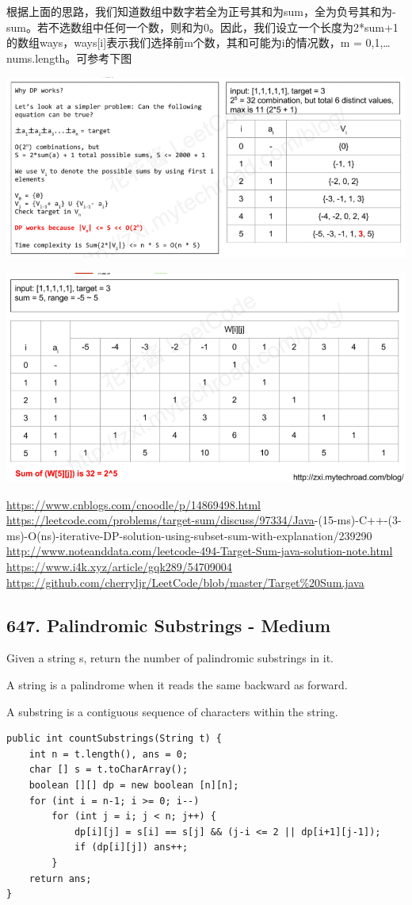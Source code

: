 \documentclass[9pt, b5paaper]{book}
\begin{document}
\begin{enumerate}
根据上面的思路，我们知道数组中数字若全为正号其和为sum，全为负号其和为-sum。若不选数组中任何一个数，则和为0。因此，我们设立一个长度为2*sum+1的数组ways，ways[i]表示我们选择前m个数，其和可能为i的情况数，m = 0,1,\ldots{}nums.length。可参考下图

\includegraphics[width=.9\linewidth]{./pic/targetSum.png}

\includegraphics[width=.9\linewidth]{./pic/targetSum2.png}

\url{https://www.cnblogs.com/cnoodle/p/14869498.html}
\url{https://leetcode.com/problems/target-sum/discuss/97334/Java}-(15-ms)-C++-(3-ms)-O(ns)-iterative-DP-solution-using-subset-sum-with-explanation/239290
\url{http://www.noteanddata.com/leetcode-494-Target-Sum-java-solution-note.html}
\url{https://www.i4k.xyz/article/gqk289/54709004}
\url{https://github.com/cherryljr/LeetCode/blob/master/Target\%20Sum.java}
\end{enumerate}

\subsection{647. Palindromic Substrings - Medium}
\label{sec-1-1-7}
Given a string s, return the number of palindromic substrings in it.

A string is a palindrome when it reads the same backward as forward.

A substring is a contiguous sequence of characters within the string.
\begin{verbatim}
public int countSubstrings(String t) {
    int n = t.length(), ans = 0;
    char [] s = t.toCharArray();
    boolean [][] dp = new boolean [n][n];
    for (int i = n-1; i >= 0; i--) 
        for (int j = i; j < n; j++) {
            dp[i][j] = s[i] == s[j] && (j-i <= 2 || dp[i+1][j-1]);
            if (dp[i][j]) ans++;
        }
    return ans;
}
\end{verbatim}
\end{document}
